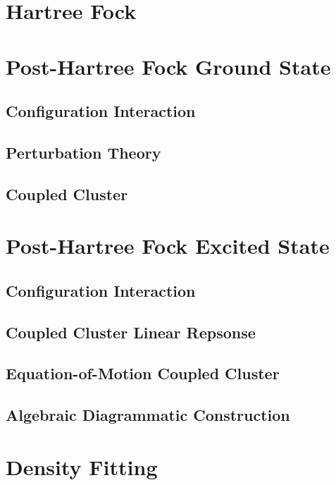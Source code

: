 \documentclass[a4paper,12pt]{article}
\begin{document}
\section{Hartree Fock}

\section{Post-Hartree Fock Ground State}

\subsection{Configuration Interaction}

\subsection{Perturbation Theory}

\subsection{Coupled Cluster}

\section{Post-Hartree Fock Excited State}

\subsection{Configuration Interaction}

\subsection{Coupled Cluster Linear Repsonse}

\subsection{Equation-of-Motion Coupled Cluster}

\subsection{Algebraic Diagrammatic Construction}

\section{Density Fitting}
\end{document}
